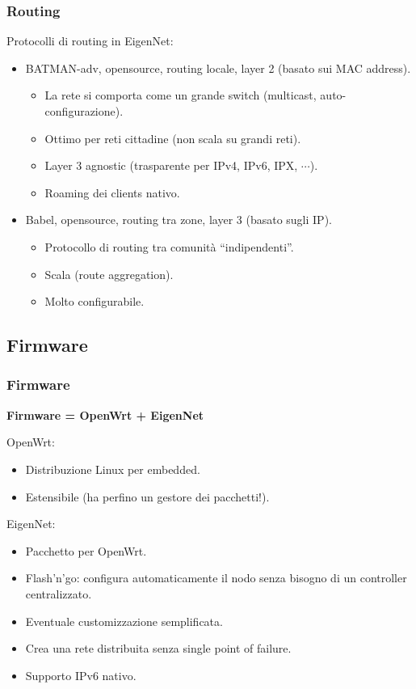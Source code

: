 \documentclass{beamer}
\begin{document}
\begin{frame}\frametitle{Routing}
Protocolli di routing in EigenNet:
\begin{itemize}
 \item BATMAN-adv, opensource, routing locale, layer 2 (basato sui MAC address).
\pause
\begin{itemize}
 \item La rete si comporta come un grande switch (multicast, auto-configurazione).\pause
 \item Ottimo per reti cittadine (non scala su grandi reti).\pause
 \item Layer 3 agnostic (trasparente per IPv4, IPv6, IPX, $\cdots$).\pause
 \item Roaming dei clients nativo.
\end{itemize}\pause
 \item Babel, opensource, routing tra zone, layer 3 (basato sugli IP). \pause
\begin{itemize}
 \item Protocollo di routing tra comunità ``indipendenti''.\pause
 \item Scala (route aggregation).\pause
 \item Molto configurabile.
\end{itemize}
\end{itemize}

\end{frame}

\subsection{Firmware}
\begin{frame}\frametitle{Firmware}
\textbf{Firmware = OpenWrt + EigenNet}

\vspace{10pt}
OpenWrt:
\begin{itemize}
 \item Distribuzione Linux per embedded.
 \item Estensibile (ha perfino un gestore dei pacchetti!).
\end{itemize}
\pause

EigenNet:
\begin{itemize}
 \item Pacchetto per OpenWrt.\pause
 \item Flash'n'go: configura automaticamente il nodo senza bisogno di un controller centralizzato.\pause
 \item Eventuale customizzazione semplificata.\pause
 \item Crea una rete distribuita senza single point of failure.\pause
 \item Supporto IPv6 nativo.
\end{itemize}

\end{frame}
\end{document}
